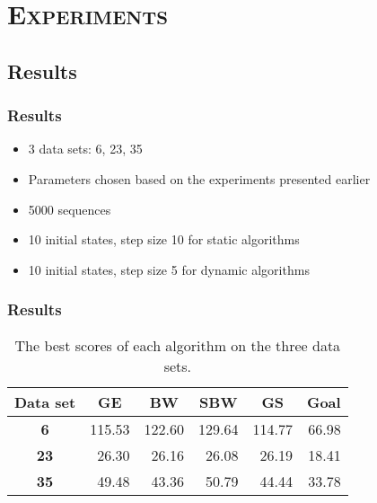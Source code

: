 \section{\scshape Experiments}
\subsection{Results}

\begin{frame}
  \frametitle{Results}
  \begin{itemize}
  	\item 3 data sets: 6, 23, 35
  	\item Parameters chosen based on the experiments presented earlier
  	\item 5000 sequences
  	\item 10 initial states, step size 10 for static algorithms
  	\item 10 initial states, step size 5 for dynamic algorithms
  \end{itemize}
\end{frame}

\begin{frame}
  \frametitle{Results} 
  \begin{center}
	\begin{table}[h]
		\centering
		\begin{tabular}{|c|r|r|r|r|r|}
		\hline
		Data set    & \multicolumn{1}{c|}{\textbf{GE}} & \multicolumn{1}{c|}{\textbf{BW}} & \multicolumn{1}{c|}{\textbf{SBW}} & \multicolumn{1}{c|}{\textbf{GS}} & \multicolumn{1}{c|}{\textbf{Goal}} \\ \hline
\textbf{6}  & 115.53                           & 122.60                           & 129.64                            & 114.77                           & 66.98                              		\\ \hline
		\textbf{23} & 26.30                            & 26.16                            & 26.08                             & 26.19                            & 18.41                              		\\ \hline
		\textbf{35} & 49.48                            & 43.36                            & 50.79                             & 44.44                            & 33.78                              		\\ \hline
		\end{tabular}
	\caption{The best scores of each algorithm on the three data sets.}
	\label{table:pautomac-best-score}
	\end{table}
  \end{center}
\end{frame}
	
